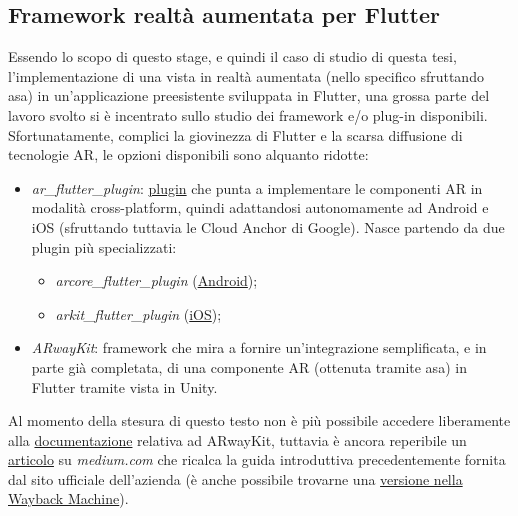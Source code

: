 \subsection{Framework realtà aumentata per Flutter}
Essendo lo scopo di questo stage, e quindi il caso di studio di questa tesi, l'implementazione di una vista in realtà aumentata (nello specifico sfruttando asa) in un'applicazione preesistente sviluppata in Flutter, una grossa parte del lavoro svolto si è incentrato sullo studio dei framework e/o plug-in disponibili.\\
Sfortunatamente, complici la giovinezza di Flutter e la scarsa diffusione di tecnologie AR, le opzioni disponibili sono alquanto ridotte:
\begin{itemize}
    \item \textit{ar\_flutter\_plugin}: \href{https://pub.dev/packages/ar_flutter_plugin}{plugin} che punta a implementare le componenti AR in modalità cross-platform, quindi adattandosi autonomamente ad Android e iOS (sfruttando tuttavia le Cloud Anchor di Google). Nasce partendo da due plugin più specializzati: 
    \begin{itemize}
        \item \textit{arcore\_flutter\_plugin} (\href{https://github.com/giandifra/arcore_flutter_plugin}{Android});
        \item \textit{arkit\_flutter\_plugin} (\href{https://github.com/olexale/arkit_flutter_plugin}{iOS});
    \end{itemize}
    \item \textit{ARwayKit}: framework che mira a fornire un'integrazione semplificata, e in parte già completata, di una componente AR (ottenuta tramite asa) in Flutter tramite vista in Unity.
\end{itemize}
{\footnotesize Al momento della stesura di questo testo non è più possibile accedere liberamente alla \href{https://app.gitbook.com/s/-MCtct_TY9f3e8PrcV9T/arwaykit-with-flutter/quickstart-in-flutter}{documentazione} relativa ad ARwayKit, tuttavia è ancora reperibile un \href{https://medium.com/arway/building-ar-navigation-apps-with-flutter-and-arwaykit-280b69401cd9}{articolo} su \textit{medium.com} che ricalca la guida introduttiva precedentemente fornita dal sito ufficiale dell'azienda (è anche possibile trovarne una \href{https://web.archive.org/web/20220525060655/https://docs.arway.app/arwaykit-with-flutter/quickstart-in-flutter}{versione nella Wayback Machine}).}

